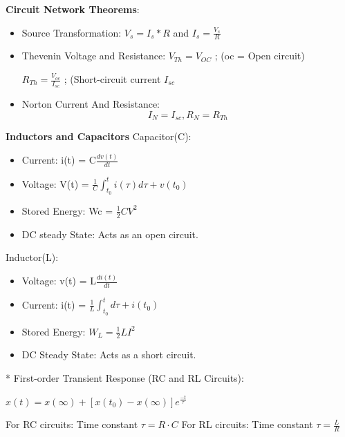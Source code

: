 \documentclass{article}
\begin{document}
\textbf{Circuit Network Theorems}:
\begin{itemize}
    \item Source Transformation: $ V_s = I_s*R$ and $ I_s = \frac{V_s}{R}$
    \item Thevenin Voltage and Resistance: $ V_{Th} = V_{OC} $ ; (oc = Open circuit)   
     \begin{center}
        $ R_{Th} = \frac{V_{oc}}{I_{sc}}$ ; (Short-circuit current $ I_{sc}$
     \end{center}
     \item Norton Current And Resistance: $$ I_N = I_{sc}, R_N = R_{Th}$$
\end{itemize}
\textbf{Inductors and Capacitors}
Capacitor(C):
\begin{itemize}
    \item Current: i(t) = C$\frac{dv(t)}{dt}$
    \item Voltage: V(t) = $ \frac{1}{C}\int_{t_0}^{t}i(\tau)d\tau + v(t_0)$
    \item Stored Energy: Wc = $ \frac{1}{2}CV^2$
    \item DC steady State: Acts as an open circuit.
\end{itemize}
Inductor(L):
\begin{itemize}
    \item Voltage: v(t) = L$ \frac{di(t)}{dt}$
    \item Current: i(t) = $ \frac{1}{L}\int_{t_0}^t d\tau + i(t_0)$
    \item Stored Energy: $ W_L = \frac{1}{2}LI^2$
    \item DC Steady State: Acts as a short circuit.
\end{itemize}
* First-order Transient Response (RC and RL Circuits):
\begin{center}
    $x(t) =x(\infty)+ [x(t_0)- x(\infty)]e^{\frac{-t}{\tau} }$
\end{center}
For RC circuits: Time constant $\tau = R\cdot C$
For RL circuits: Time constant $\tau = \frac{L}{R}$
\end{document}
